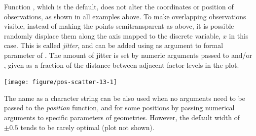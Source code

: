\documentclass[krantz2]{krantz}\usepackage{knitr}
\begin{document}
Function\label{par:plot:pos:jitter} , which is the default, does not alter the coordinates or position of observations, as shown in all examples above. To make overlapping observations visible, instead of making the points semitransparent as above, it is possible randomly displace them along the axis mapped to the discrete variable, $x$ in this case. This is called \emph{jitter}, and can be added using  as argument to formal parameter  of . The amount of jitter is set by numeric arguments passed to  and/or , given as a fraction of the distance between adjacent factor levels in the plot.

\begin{knitrout}\footnotesize
{}\color{fgcolor}\begin{kframe}
\begin{alltt}
\hlstd{(} 
        \hlstd{=} \hlstd{(} \hlstd{=}    \hlopt{+}
  \hlstd{(} \hlstd{=} \hlstd{(} \hlstd{=} \hlstd{,}  \hlstd{=} \hlstd{))}
\end{alltt}
\end{kframe}

{\centering \texttt{[image: figure/pos-scatter-13-1]} 

}


\end{knitrout}

\begin{warningbox}
   The name as a character string can be also used when no arguments need to be passed to the \emph{position} function, and for some positions by passing numerical arguments to specific parameters of geometries. However, the default width of $\pm0.5$ tends to be rarely optimal (plot not shown).

\begin{knitrout}\footnotesize
{}\color{fgcolor}\begin{kframe}
\begin{alltt}
\hlstd{(} 
        \hlstd{=} \hlstd{(} \hlstd{=}     \hlstd{=}  \hlopt{+}
  \hlstd{(} \hlstd{=} \hlstd{)}
\end{alltt}
\end{kframe}
\end{knitrout}
\end{warningbox}
\end{document}
